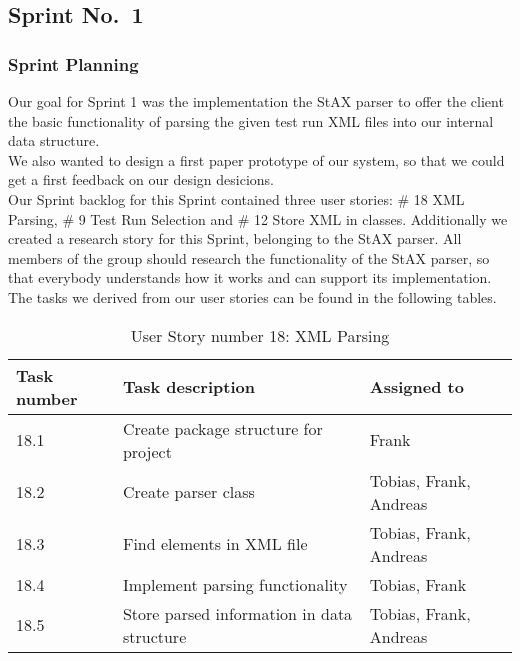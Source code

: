 
\subsection{Sprint No.~1}

\subsubsection*{Sprint Planning}

Our goal for Sprint 1 was the implementation the StAX parser to offer the client the basic functionality of parsing the given test run XML files into our internal data structure. \\ 
We also wanted to design a first paper prototype of our system, so that we could get a first feedback on our design desicions. \\ 
Our Sprint backlog for this Sprint contained three user stories: \# 18 XML Parsing, \# 9 Test Run Selection and \# 12 Store XML in classes. Additionally we created a research story for this Sprint, belonging to the StAX parser. All members of the group should research the functionality of the StAX parser, so that everybody understands how it works and can support its implementation. \\ 
The tasks we derived from our user stories can be found in the following tables. \\ 

\begin{table}[h]
  \caption{User Story number 18: XML Parsing}
  \label{US_Parsing}
  \centering
  \begin{tabular}{p{1.5cm}|p{9cm}|p{3cm}|}
  	Task number & Task description & Assigned to \\ 
  	\hline
  	\hline
  	18.1 & Create package structure for project & Frank \\
  	\hline
  	18.2 & Create parser class & Tobias, Frank, Andreas \\ 
  	\hline
  	18.3 & Find elements in XML file & Tobias, Frank, Andreas \\ 
  	\hline
  	18.4 & Implement parsing functionality & Tobias, Frank \\ 
  	\hline
  	18.5 & Store parsed information in data structure & Tobias, Frank, Andreas \\ 
  	\hline
  \end{tabular}
\end{table} 

\ \\

